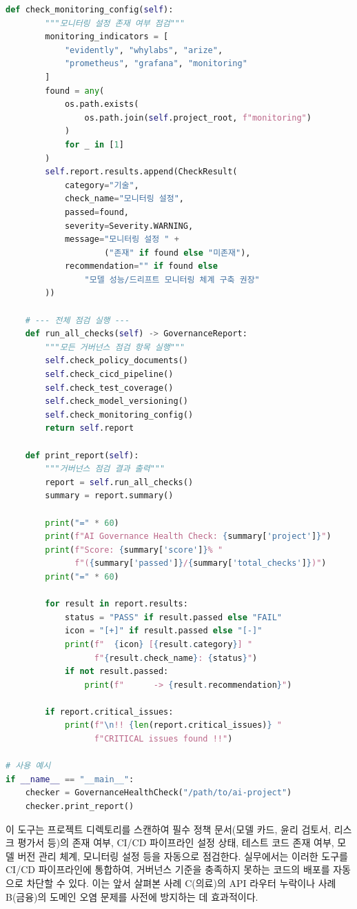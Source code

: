 \begin{lstlisting}[language=Python, caption={AI 거버넌스 Health Check 자동화 도구}, label={lst:governance_health_check}]
    def check_monitoring_config(self):
        """모니터링 설정 존재 여부 점검"""
        monitoring_indicators = [
            "evidently", "whylabs", "arize",
            "prometheus", "grafana", "monitoring"
        ]
        found = any(
            os.path.exists(
                os.path.join(self.project_root, f"monitoring")
            )
            for _ in [1]
        )
        self.report.results.append(CheckResult(
            category="기술",
            check_name="모니터링 설정",
            passed=found,
            severity=Severity.WARNING,
            message="모니터링 설정 " +
                    ("존재" if found else "미존재"),
            recommendation="" if found else
                "모델 성능/드리프트 모니터링 체계 구축 권장"
        ))

    # --- 전체 점검 실행 ---
    def run_all_checks(self) -> GovernanceReport:
        """모든 거버넌스 점검 항목 실행"""
        self.check_policy_documents()
        self.check_cicd_pipeline()
        self.check_test_coverage()
        self.check_model_versioning()
        self.check_monitoring_config()
        return self.report

    def print_report(self):
        """거버넌스 점검 결과 출력"""
        report = self.run_all_checks()
        summary = report.summary()

        print("=" * 60)
        print(f"AI Governance Health Check: {summary['project']}")
        print(f"Score: {summary['score']}% "
              f"({summary['passed']}/{summary['total_checks']})")
        print("=" * 60)

        for result in report.results:
            status = "PASS" if result.passed else "FAIL"
            icon = "[+]" if result.passed else "[-]"
            print(f"  {icon} [{result.category}] "
                  f"{result.check_name}: {status}")
            if not result.passed:
                print(f"      -> {result.recommendation}")

        if report.critical_issues:
            print(f"\n!! {len(report.critical_issues)} "
                  f"CRITICAL issues found !!")

# 사용 예시
if __name__ == "__main__":
    checker = GovernanceHealthCheck("/path/to/ai-project")
    checker.print_report()
\end{lstlisting}

이 도구는 프로젝트 디렉토리를 스캔하여 필수 정책 문서(모델 카드, 윤리 검토서, 리스크 평가서 등)의 존재 여부, CI/CD 파이프라인 설정 상태, 테스트 코드 존재 여부, 모델 버전 관리 체계, 모니터링 설정 등을 자동으로 점검한다. 실무에서는 이러한 도구를 CI/CD 파이프라인에 통합하여, 거버넌스 기준을 충족하지 못하는 코드의 배포를 자동으로 차단할 수 있다. 이는 앞서 살펴본 사례 C(의료)의 API 라우터 누락이나 사례 B(금융)의 도메인 오염 문제를 사전에 방지하는 데 효과적이다.

